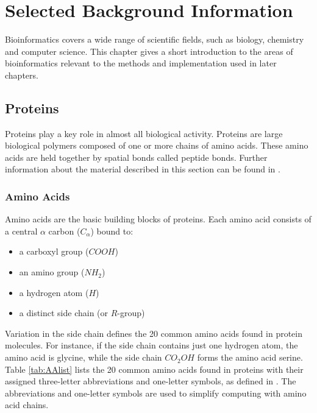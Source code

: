 
\chapter{Selected Background Information}
\label{ch:selectedBG}

Bioinformatics covers a wide range of scientific fields, such as biology, chemistry and computer science. This chapter gives a short introduction to the areas of bioinformatics relevant to the methods and implementation used in later chapters. 


\section{Proteins}

Proteins play a key role in almost all biological activity. Proteins are large biological polymers composed of one or more chains of amino acids. These amino acids are held together by spatial bonds called peptide bonds. Further information about the material described in this section can be found in \cite{ Nelson.2013, Gromiha.2010, Berg.imp.2002}.

\subsection{Amino Acids}
\label{ssec:AminoAcid}

Amino acids are the basic building blocks of proteins. Each amino acid consists of a central $\alpha$ carbon ($C_\alpha$) bound to:

\begin{itemize}
\item  a carboxyl group ($COOH$)

\item an amino group ($NH_2$)

\item a hydrogen atom ($H$)

\item a distinct side chain (or $R$-group)
\end{itemize}

Variation in the side chain defines the 20 common amino acids found in protein molecules. For instance, if the side chain contains just one hydrogen atom, the amino acid is glycine, while the side chain $CO_2OH$ forms the amino acid serine. Table \ref{tab:AAlist} lists the 20 common amino acids found in proteins with their assigned three-letter abbreviations and one-letter symbols, as defined in \cite{IUPACIUBJointCommissiononBiochemicalNomenclature.1984}. The abbreviations and one-letter symbols are used to simplify computing with amino acid chains.


